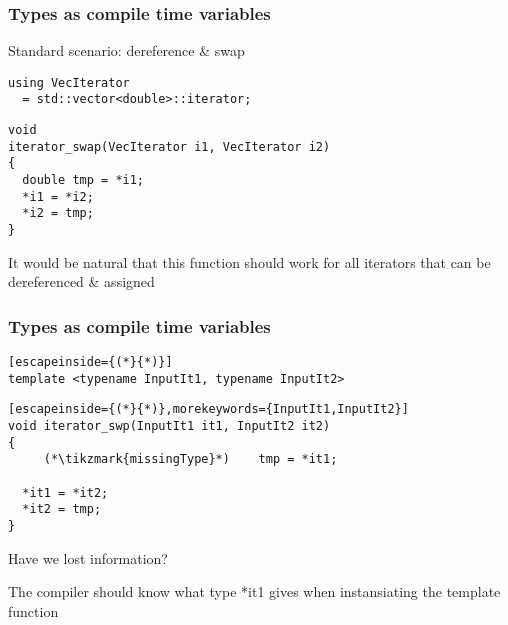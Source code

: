 \documentclass[14pt,a4paper,dvipsnames,usenames]{beamer}
\begin{document}
\begin{frame}[fragile]
  \frametitle{Types as compile time variables}

  Standard scenario: dereference \& swap

  \vspace{.25cm}
  \begin{lstlisting}
using VecIterator
  = std::vector<double>::iterator;
  \end{lstlisting}
  \begin{lstlisting}[morekeywords={VecIterator}]
void
iterator_swap(VecIterator i1, VecIterator i2)
{
  double tmp = *i1;
  *i1 = *i2;
  *i2 = tmp;
}
  \end{lstlisting}

  \vspace{.25cm}
  It would be natural that this function should work for all iterators that can be dereferenced \& assigned
  
\end{frame}

\begin{frame}[fragile]
  \frametitle{Types as compile time variables}

  \begin{lstlisting}[escapeinside={(*}{*)}]
template <typename InputIt1, typename InputIt2>
  \end{lstlisting}
  \vspace*{-.4cm}
  \begin{lstlisting}[escapeinside={(*}{*)},morekeywords={InputIt1,InputIt2}]
void iterator_swp(InputIt1 it1, InputIt2 it2)
{
     (*\tikzmark{missingType}*)    tmp = *it1;

  *it1 = *it2;
  *it2 = tmp;
}
  \end{lstlisting}

  \vspace{.5cm}
  Have we lost information?

  \vspace{.5cm}
  The compiler should know what type {\color{Tropiteal}*it1} gives when instansiating the template function 

  \nointerlineskip
  
\end{frame}
\end{document}

